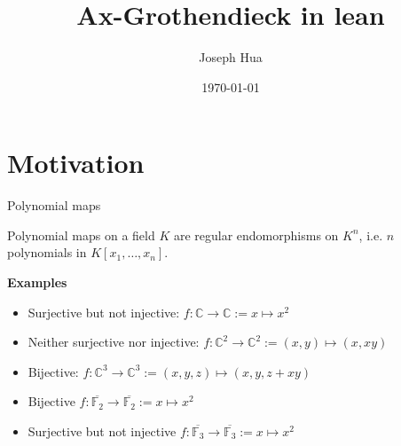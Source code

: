 \documentclass[10pt]{beamer}
\title{Ax-Grothendieck in lean}
\subtitle{Joseph Hua}
\date{\today}
\institute{Imperial College London}
\newcommand{\C}{\mathbb{C}}
\newcommand{\F}{\mathbb{F}}
\renewcommand{\bar}[1]{\overline{#1}}
\newcommand{\<}{\langle}
\renewcommand{\>}{\rangle}
\newcommand{\link}[1]{\hypertarget{#1}{}}
\begin{document}
\maketitle

\section{Motivation}

\begin{frame}[fragile]{Polynomial maps}

  \begin{definition}
    \link{poly_map}
    Polynomial maps on a field $K$ are regular endomorphisms on $K^{n}$,
    i.e. $n$ polynomials in $K[x_1,\dots,x_{n}]$.
  \end{definition}

  \pause

  \textbf{Examples}

  \begin{itemize}
    \item <2-> Surjective but not injective: $f : \C \to \C := x \mapsto x^{2}$

    \item <3-> Neither surjective nor injective:
          $f : \C^{2} \to \C^{2} := (x,y) \mapsto (x,xy)$
    \item <4-> Bijective:
          $f : \C^{3} \to \C^{3} := (x,y,z) \mapsto ( x , y , z + xy )$
    \item <5-> Bijective $f : \bar{\F_{2}} \to \bar{\F_{2}}  := x \mapsto x^{2}$
    \item <6-> Surjective but not injective $f : \bar{\F_{3}} \to \bar{\F_{3}} := x \mapsto x^{2}$
  \end{itemize}




\end{frame}
\end{document}

